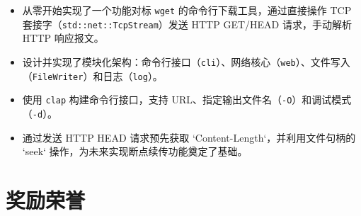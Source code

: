 \documentclass{resume}
\begin{document}
\begin{itemize}
  \item 从零开始实现了一个功能对标 \texttt{wget} 的命令行下载工具，通过直接操作 TCP 套接字（\texttt{std::net::TcpStream}）发送 HTTP GET/HEAD 请求，手动解析 HTTP 响应报文。
  \item 设计并实现了模块化架构：命令行接口（\texttt{cli}）、网络核心（\texttt{web}）、文件写入（\texttt{FileWriter}）和日志（\texttt{log}）。
  \item 使用 \texttt{clap} 构建命令行接口，支持 URL、指定输出文件名（\texttt{-O}）和调试模式（\texttt{-d}）。
  \item 通过发送 HTTP HEAD 请求预先获取 `Content-Length`，并利用文件句柄的 `seek` 操作，为未来实现断点续传功能奠定了基础。
\end{itemize}





\section{奖励荣誉}
\end{document}
